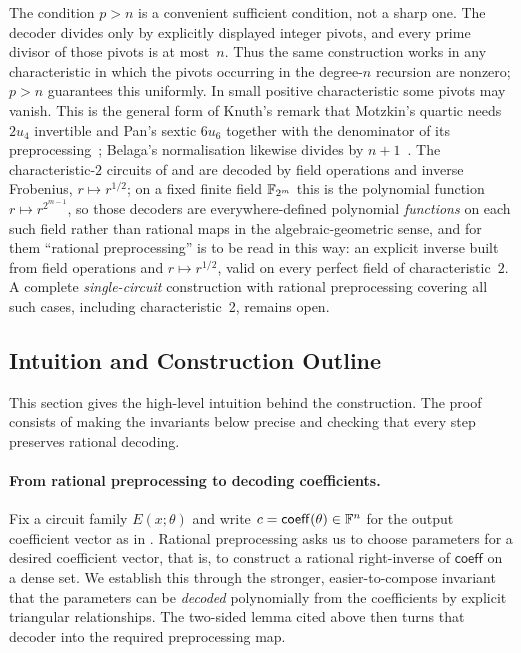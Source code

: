 \begin{remark}
\label{rem:char2}
The condition $p>n$ is a convenient sufficient condition, not a sharp one.
The decoder divides only by explicitly displayed integer pivots, and every
prime divisor of those pivots is at most~$n$.  Thus the same construction works in any
characteristic in which the pivots occurring in the degree-$n$ recursion are
nonzero; $p>n$ guarantees this uniformly.  In small positive characteristic
some pivots may vanish.  This is the general form of Knuth's remark that
Motzkin's quartic needs $2u_4$ invertible and Pan's sextic $6u_6$
together with the denominator of its
preprocessing~\cite[p.~494]{knuth1997seminumerical}; Belaga's normalisation
likewise divides by $n+1$~\cite{belaga1958some}.  The characteristic-$2$ circuits of
 and  are decoded by field operations
and inverse Frobenius, $r\mapsto r^{1/2}$; on a fixed finite field $\mathbb{F}_{2^m}$
this is the polynomial function $r\mapsto r^{2^{m-1}}$, so those decoders are
everywhere-defined polynomial \emph{functions} on each such field rather than
rational maps in the algebraic-geometric sense, and for them ``rational
preprocessing'' is to be read in this way: an explicit inverse built from
field operations and $r\mapsto r^{1/2}$, valid on every perfect field of
characteristic~$2$.  A complete \emph{single-circuit} construction with
rational preprocessing covering all such cases, including characteristic~2,
remains open.
\end{remark}

\subsection{Intuition and Construction Outline}
\label{sec:main-theorem:outline}

This section gives the high-level intuition behind the construction.
The proof consists of making the invariants below precise and checking that every step preserves rational decoding.

\paragraph{From rational preprocessing to decoding coefficients.}
Fix a circuit family $E(x;\theta)$ and write $c=\mathsf{coeff}(\theta)\in\mathbb{F}^n$ for the output coefficient vector as in .
Rational preprocessing asks us to choose parameters for a desired coefficient
vector, that is, to construct a rational right-inverse of $\mathsf{coeff}$ on
a dense set.  We establish this through the stronger, easier-to-compose
invariant that the parameters can be \emph{decoded} polynomially from the
coefficients by explicit triangular relationships.  The two-sided lemma cited
above then turns that decoder into the required preprocessing map.


